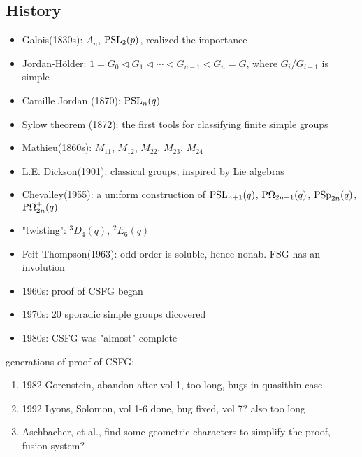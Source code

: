 \documentclass[a4paper,11pt]{article}
\begin{document}
\subsection{History}
\begin{itemize}
	\item[] Galois(1830s): $A_n$, $\mathrm{PSL}_2(p)$, realized the importance
	\item[] Jordan-H\"older: $1=G_0\triangleleft G_1\triangleleft \cdots\triangleleft G_{n-1}\triangleleft G_n=G$, where $G_{i}/G_{i-1}$ is simple
	\item[] Camille Jordan (1870): $\mathrm{PSL}_n(q)$
	\item[] Sylow theorem (1872): the first tools for classifying finite simple groups
	\item[] Mathieu(1860s): $M_{11}$, $M_{12}$, $M_{22}$, $M_{23}$, $M_{24}$
	\item[] L.E. Dickson(1901): classical groups, inspired by Lie algebras
	\item[] Chevalley(1955): a uniform construction of $\mathrm{PSL}_{n+1}(q)$, $\mathrm{P\Omega}_{2n+1}(q)$, $\mathrm{PSp}_{2n}(q)$, $\mathrm{P\Omega}_{2n}^+(q)$
	\item[] "twisting": $^3D_4(q)$, $^2E_6(q)$
	\item[] Feit-Thompson(1963): odd order is soluble, hence nonab. FSG has an involution
	\item[] 1960s: proof of CSFG began
	\item[] 1970s: 20 sporadic simple groups dicovered
	\item[] 1980s: CSFG was "almost" complete
\end{itemize}

 generations of proof of CSFG:
\begin{enumerate}
	\item 1982 Gorenstein, abandon after vol 1, too long, bugs in quasithin case
	\item 1992 Lyons, Solomon, vol 1-6 done, bug fixed, vol 7? also too long 
	\item Aschbacher, et al., find some geometric characters to simplify the proof, fusion system?
\end{enumerate}

\newpage
\end{document}
